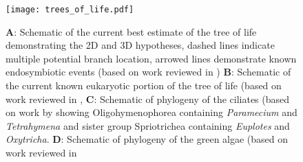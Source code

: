 %
%
%
%
%
%
%
%
%





 



\begin{figure}
    \texttt{[image: trees\_of\_life.pdf]}
    \caption[Taxonomic context of host and endosymbiont]{\textbf{A}: Schematic of the current best estimate of the tree of life demonstrating the 2D and 3D hypotheses,
dashed lines indicate multiple potential branch location, arrowed lines demonstrate known endosymbiotic events (based on work reviewed in \citep{Gribaldo2010})
\textbf{B}: Schematic of the current known eukaryotic portion of the tree of life (based on work reviewed in \citep{Burki2014,Adl2013},
\textbf{C}: Schematic of phylogeny of the ciliates (based on work by \citep{Bachvaroff2011} showing Oligohymenophorea containing \textit{Paramecium} and \textit{Tetrahymena} and sister group Spriotrichea containing \textit{Euplotes} and \textit{Oxytricha}.
\textbf{D}: Schematic of phylogeny of the green algae (based on work reviewed in \citep{Leliaert2012}}
    \label{fig:tol}
\end{figure}

